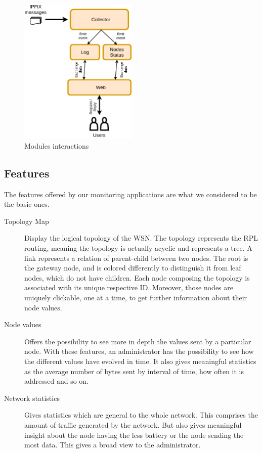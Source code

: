 \begin{figure}
	\centering
	\includegraphics[width=0.5\textwidth]{res/modules.png}
	\caption{Modules interactions}
	\label{fig:modules}
\end{figure}

\subsection{Features}

The features offered by our monitoring applications are what we considered to be the basic ones.

\begin{description}
	\item[Topology Map] Display the logical topology of the WSN. The topology represents the RPL routing, meaning the topology is actually acyclic and represents a tree. A link represents a relation of parent-child between two nodes. The root is the gateway node, and is colored differently to distinguish it from leaf nodes, which do not have children. Each node composing the topology is associated with its unique respective ID. Moreover, those nodes are uniquely clickable, one at a time, to get further information about their node values.
	\item[Node values] Offers the possibility to see more in depth the values sent by a particular node. With these features, an administrator has the possibility to see how the different values have evolved in time. It also gives meaningful statistics as the average number of bytes sent by interval of time, how often it is addressed and so on.
	\item[Network statistics] Gives statistics which are general to the whole network. This comprises the amount of traffic generated by the network. But also gives meaningful insight about the node having the less battery or the node sending the most data. This gives a broad view to the administrator.
\end{description}

